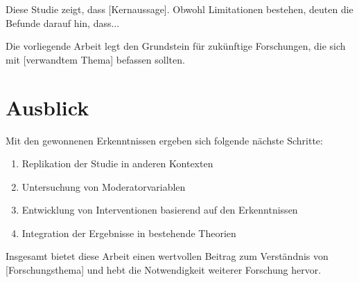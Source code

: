 Diese Studie zeigt, dass [Kernaussage]. Obwohl Limitationen bestehen,
deuten die Befunde darauf hin, dass...

Die vorliegende Arbeit legt den Grundstein für zukünftige Forschungen,
die sich mit [verwandtem Thema] befassen sollten.

\section{Ausblick}
\label{sec:conc:outlook}

Mit den gewonnenen Erkenntnissen ergeben sich folgende nächste Schritte:

\begin{enumerate}
    \item Replikation der Studie in anderen Kontexten
    \item Untersuchung von Moderatorvariablen
    \item Entwicklung von Interventionen basierend auf den Erkenntnissen
    \item Integration der Ergebnisse in bestehende Theorien
\end{enumerate}

Insgesamt bietet diese Arbeit einen wertvollen Beitrag zum Verständnis
von [Forschungsthema] und hebt die Notwendigkeit weiterer Forschung hervor.
